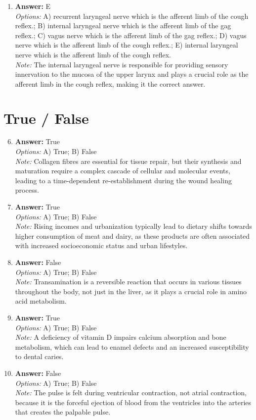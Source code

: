 \documentclass[12pt]{article}
\begin{document}
\begin{enumerate}[label=\arabic*.]
\item \textbf{Answer:} E
\\ \textit{Options:} A) recurrent laryngeal nerve which is the afferent limb of the cough reflex.; B) internal laryngeal nerve which is the afferent limb of the gag reflex.; C) vagus nerve which is the afferent limb of the gag reflex.; D) vagus nerve which is the afferent limb of the cough reflex.; E) internal laryngeal nerve which is the afferent limb of the cough reflex.
\\ \textit{Note:} The internal laryngeal nerve is responsible for providing sensory innervation to the mucosa of the upper larynx and plays a crucial role as the afferent limb in the cough reflex, making it the correct answer.
\end{enumerate}

\section*{True / False}
\begin{enumerate}[label=\arabic*.]
\setcounter{enumi}{5}
\item \textbf{Answer:} True
\\ \textit{Options:} A) True; B) False
\\ \textit{Note:} Collagen fibres are essential for tissue repair, but their synthesis and maturation require a complex cascade of cellular and molecular events, leading to a time-dependent re-establishment during the wound healing process.
\item \textbf{Answer:} True
\\ \textit{Options:} A) True; B) False
\\ \textit{Note:} Rising incomes and urbanization typically lead to dietary shifts towards higher consumption of meat and dairy, as these products are often associated with increased socioeconomic status and urban lifestyles.
\item \textbf{Answer:} False
\\ \textit{Options:} A) True; B) False
\\ \textit{Note:} Transamination is a reversible reaction that occurs in various tissues throughout the body, not just in the liver, as it plays a crucial role in amino acid metabolism.
\item \textbf{Answer:} True
\\ \textit{Options:} A) True; B) False
\\ \textit{Note:} A deficiency of vitamin D impairs calcium absorption and bone metabolism, which can lead to enamel defects and an increased susceptibility to dental caries.
\item \textbf{Answer:} False
\\ \textit{Options:} A) True; B) False
\\ \textit{Note:} The pulse is felt during ventricular contraction, not atrial contraction, because it is the forceful ejection of blood from the ventricles into the arteries that creates the palpable pulse.
\end{enumerate}
\end{document}
